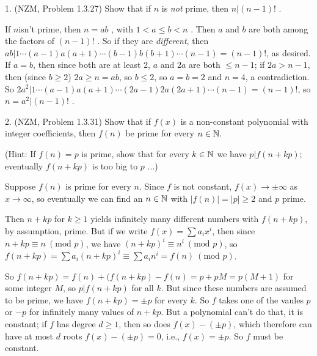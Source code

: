 



\loadmsbm

\ctln{\centerline}
\ssk{\smallskip}
\msk{\medskip}
\bsk{\bigskip}

\overfullrule=0pt
\parindent=0pt

\nopagenumbers


\bsk

\item{1.} (NZM, Problem 1.3.27) Show that if $n$ is {\it not} prime, then $n|(n-1)!$ .

\msk

If $n$isn't prime, then $n=ab$ , with $1<a\leq b<n$ . Then $a$ and $b$ are
both among the factors of $(n-1)!$ . So if they are {\it different}, then 
$ab|1\cdots(a-1)a(a+1)\cdots (b-1)b(b+1)\cdots(n-1)=(n-1)!$,
as desired. If $a=b$, then since both are at least 2, $a$ and $2a$ are both $\leq n-1$; 
if $2a> n-1$, then (since $b\geq 2$) $2a\geq n=ab$, so $b\leq 2$, so  $a=b=2$ and $n=4$,
a contradiction. So $2a^2|1\cdots(a-1)a(a+1)\cdots (2a-1)2a(2a+1)\cdots(n-1)=(n-1)!$, so $n=a^2|(n-1)!$ .

\msk

\item{2.} (NZM, Problem 1.3.31) Show that if $f(x)$ is a non-constant polynomial
with integer coefficients, then $f(n)$  be prime for every $n\in {\Bbb N}$.

\item{}(Hint: If $f(n)=p$ is prime, show that for every $k\in {\Bbb N}$ we have $p|f(n+kp)$;
eventually $f(n+kp)$ is too big to  $p$ ...)

\msk

Suppose $f(n)$ is prime for every $n$.
Since $f$ is not constant, $f(x)\rightarrow \pm\infty$ as $x\rightarrow\infty$, so eventually
we can find an $n\in{\Bbb N}$ with $|f(n)|=|p|\geq 2$ and $p$ prime.

\ssk

Then $n+kp$ for $k\geq 1$ yields infinitely many different numbers with $f(n+kp)$, by
assumption, prime. But if we write $f(x)=\sum a_ix^i$, then since $n+kp\equiv n\ (\text{mod } p)$,
we have $(n+kp)^i\equiv n^i\ (\text{mod } p)$, so 
$f(n+kp)=\sum a_i(n+kp)^i\equiv \sum a_in^i=f(n)\ (\text{mod } p)$. 

\ssk

So $f(n+kp)=f(n)+(f(n+kp)-f(n)=p+pM=p(M+1)$ for some integer $M$, so 
$p|f(n+kp)$ for all $k$. But since these numbers are assumed to be prime, we have
$f(n+kp)=\pm p$ for every $k$. So $f$ takes one of the vaules $p$ or $-p$ for 
infinitely many values of $n+kp$. But a polynomial can't do that, 
it is constant; if $f$ has degree $d\geq 1$, then so does $f(x)-(\pm p)$, which therefore
can have at most $d$ roots $f(x)-(\pm p)=0$, i.e., $f(x)=\pm p$. So $f$ must be constant.


